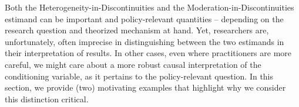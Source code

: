 \documentclass[12pt]{article}
\begin{document}
Both the Heterogeneity-in-Discontinuities and the Moderation-in-Discontinuities estimand can be important and policy-relevant quantities -- depending on the research question and theorized mechanism at hand. Yet, researchers are, unfortunately, often imprecise in distinguishing between the two estimands in their interpretation of results. In other cases, even where practitioners are more careful, we might care about a more robust causal interpretation of the conditioning variable, as it pertains to the policy-relevant question. In this section, we provide (two) motivating examples that highlight why we consider this distinction critical.


\end{document}
